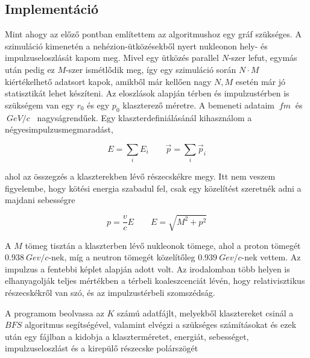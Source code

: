 \documentclass[a4paper,12pt]{article}
\begin{document}
\subsection{ Implementáció}

\par Mint ahogy az előző pontban említettem az algoritmushoz egy gráf szükséges. A szimuláció kimenetén a nehézion-ütközésekből nyert nukleonon hely- és impulzuseloszlását kapom meg. Mivel egy ütközés parallel $N$-szer lefut, egymás után pedig ez $M$-szer ismétlődik meg, így egy szimuláció során $N\cdot M$ kiértékelhető adatsort kapok, amikből már kellően nagy $N, M$ esetén már jó statisztikát lehet készíteni. Az eloszlások alapján térben és impulzustérben is szükségem van egy $r_{0}$ és egy $p_{0}$ klaszterező méretre. A bemeneti adataim $~fm~$ és $~GeV/c$~ nagyságrendűek. Egy klaszterdefiniálásánál kihasználom a négyesimpulzusmegmaradást, 

\vspace{5mm}

\begin{equation}
	E = \sum_{i} E_{i} \quad \quad \vec{p} = \sum_{i} \vec{p}_{i}
\end{equation} 

\vspace{5mm}

\par ahol az összegzés a klaszterekben lévő részecskékre megy. Itt nem veszem figyelembe, hogy kötési energia szabadul fel, csak egy közelítést szeretnék adni a majdani sebességre

\vspace{5mm}

\begin{equation}
	p = \frac{v}{c} E \quad \quad E = \sqrt{M^{2} + p^{2}}
\end{equation}

\vspace{5mm}

\par A $M$ tömeg tisztán a klaszterben lévő nukleonok tömege, ahol a proton tömegét $0.938 ~Gev/c$-nek, míg a neutron tömegét közelítőleg $0.939 ~Gev/c$-nek vettem. Az impulzus a fentebbi képlet alapján adott volt. Az irodalomban több helyen is elhanyagolják teljes mértékben a térbeli koaleszcenciát lévén, hogy relativisztikus részecskékről van szó, és az impulzustérbeli szomszédság. 

\vspace{5mm}

\par A programom beolvassa az $K$ számú adatfájlt, melyekből klasztereket csinál a $BFS$ algoritmus segítségével, valamint elvégzi a szükséges számításokat és ezek után egy fájlban a kidobja a klaszterméretet, energiát, sebességet, impulzuseloszlást és a kirepülő részecske polárszögét
\end{document}
